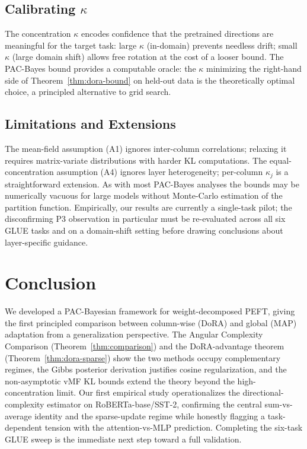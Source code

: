 \documentclass[11pt]{article}
\begin{document}
\subsection{Calibrating $\kappa$}
The concentration $\kappa$ encodes confidence that the pretrained directions are
meaningful for the target task: large $\kappa$ (in-domain) prevents needless drift;
small $\kappa$ (large domain shift) allows free rotation at the cost of a looser
bound. The PAC-Bayes bound provides a computable oracle: the $\kappa$ minimizing the
right-hand side of Theorem~\ref{thm:dora-bound} on held-out data is the theoretically
optimal choice, a principled alternative to grid search.

\subsection{Limitations and Extensions}
The mean-field assumption (A1) ignores inter-column correlations; relaxing it
requires matrix-variate distributions with harder KL computations. The
equal-concentration assumption (A4) ignores layer heterogeneity; per-column $\kappa_j$
is a straightforward extension. As with most PAC-Bayes analyses the bounds may be
numerically vacuous for large models without Monte-Carlo estimation of the partition
function. Empirically, our results are currently a single-task pilot; the
disconfirming P3 observation in particular must be re-evaluated across all six GLUE
tasks and on a domain-shift setting before drawing conclusions about layer-specific
guidance.

\section{Conclusion}
We developed a PAC-Bayesian framework for weight-decomposed PEFT, giving the first
principled comparison between column-wise (DoRA) and global (MAP) adaptation from a
generalization perspective. The Angular Complexity Comparison
(Theorem~\ref{thm:comparison}) and the DoRA-advantage theorem
(Theorem~\ref{thm:dora-sparse}) show the two methods occupy complementary regimes,
the Gibbs posterior derivation justifies cosine regularization, and the
non-asymptotic vMF KL bounds extend the theory beyond the high-concentration limit.
Our first empirical study operationalizes the directional-complexity estimator on
RoBERTa-base/SST-2, confirming the central sum-vs-average identity and the
sparse-update regime while honestly flagging a task-dependent tension with the
attention-vs-MLP prediction. Completing the six-task GLUE sweep is the immediate next
step toward a full validation.
\end{document}
